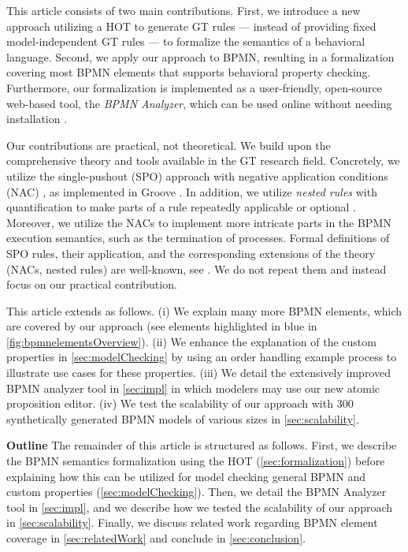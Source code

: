 \documentclass{lmcs} %
\begin{document}
This article consists of two main contributions.
First, we introduce a new approach utilizing a HOT to generate GT rules --- instead of providing fixed model-independent GT rules --- to formalize the semantics of a behavioral language.
Second, we apply our approach to BPMN, resulting in a formalization covering most BPMN elements that supports behavioral property checking.
Furthermore, our formalization is implemented as a user-friendly, open-source web-based tool, the \textit{BPMN Analyzer}, which can be used online without needing installation \cite{timkrauterLMCS2024Artifacts2023}.

Our contributions are practical, not theoretical.
We build upon the comprehensive theory and tools available in the GT research field.
Concretely, we utilize the single-pushout (SPO) approach with negative application conditions (NAC) \cite{ehrigALGEBRAICAPPROACHESGRAPH1997}, as implemented in Groove \cite{rensinkGROOVESimulatorTool2004}.
In addition, we utilize \textit{nested rules} with quantification to make parts of a rule repeatedly applicable or optional \cite{rensinkNestedQuantificationGraph2006,rensinkHowMuchAre2017}.
Moreover, we utilize the NACs to implement more intricate parts in the BPMN execution semantics, such as the termination of processes.
Formal definitions of SPO rules, their application, and the corresponding extensions of the theory (NACs, nested rules) are well-known, see \cite{ehrigALGEBRAICAPPROACHESGRAPH1997,rensinkNestedQuantificationGraph2006}.
We do not repeat them and instead focus on our practical contribution.

This article extends \cite{krauterFormalizationAnalysisBPMN2023} as follows.
(i) We explain many more BPMN elements, which are covered by our approach (see elements highlighted in blue in \autoref{fig:bpmnelementsOverview}).
(ii) We enhance the explanation of the custom properties in \autoref{sec:modelChecking} by using an order handling example process to illustrate use cases for these properties.
(iii) We detail the extensively improved BPMN analyzer tool in \autoref{sec:impl} in which modelers may use our new atomic proposition editor.
(iv) We test the scalability of our approach with 300 synthetically generated BPMN models of various sizes in \autoref{sec:scalability}. 

\textbf{Outline} The remainder of this article is structured as follows.
First, we describe the BPMN semantics formalization using the HOT (\autoref{sec:formalization}) before explaining how this can be utilized for model checking general BPMN and custom properties (\autoref{sec:modelChecking}).
Then, we detail the BPMN Analyzer tool in \autoref{sec:impl}, and we describe how we tested the scalability of our approach in \autoref{sec:scalability}.
Finally, we discuss related work regarding BPMN element coverage in \autoref{sec:relatedWork} and conclude in \autoref{sec:conclusion}.
\end{document}
